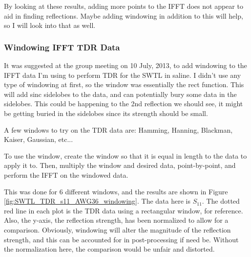\documentclass[12pt,onecolumn,titlepage]{article}
\begin{document}
By looking at these results, adding more points to the IFFT does not appear to aid in finding reflections. Maybe adding windowing in addition to this will help, so I will look into that as well. 



\subsubsection{Windowing IFFT TDR Data}
\indent \indent It was suggested at the group meeting on 10 July, 2013, to add windowing to the IFFT data I'm using to perform TDR for the SWTL in saline. I didn't use any type of windowing at first, so the window was essentially the rect function. This will add sinc sidelobes to the data, and can potentially bury some data in the sidelobes. This could be happening to the 2nd reflection we should see, it might be getting buried in the sidelobes since its strength should be small. 

A few windows to try on the TDR data are: Hamming, Hanning, Blackman, Kaiser, Gaussian, etc...

To use the window, create the window so that it is equal in length to the data to apply it to. Then, multiply the window and desired data, point-by-point, and perform the IFFT on the windowed data. 

This was done for 6 different windows, and the results are shown in Figure \ref{fig:SWTL_TDR_s11_AWG36_windowing}. The data here is $S_{11}$. The dotted red line in each plot is the TDR data using a rectangular window, for reference. Also, the y-axis, the reflection strength, has been normalized to allow for a comparison. Obviously, windowing will alter the magnitude of the reflection strength, and this can be accounted for in post-processing if need be. Without the normalization here, the comparison would be unfair and distorted. 
\end{document}
